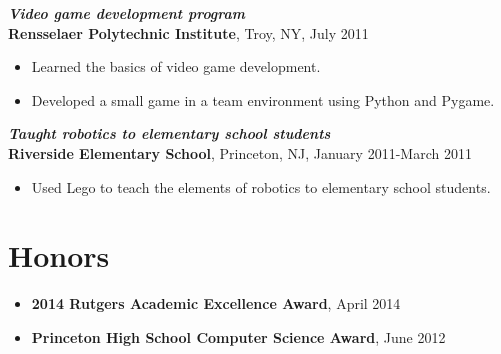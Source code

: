 \documentclass[letterpaper,12pt]{article}
\begin{document}
\textit{\textbf{Video game development program}} \\
\textbf{Rensselaer Polytechnic Institute}, Troy, NY, July 2011
\begin{itemize}
\item
Learned the basics of video game development.
\item
Developed a small game in a team environment using Python and Pygame.
\end{itemize}

\textit{\textbf{Taught robotics to elementary school students}} \\
\textbf{Riverside Elementary School}, Princeton, NJ, January 2011-March 2011
\begin{itemize}
\item
Used Lego to teach the elements of robotics to elementary school students.
\end{itemize}

\fi

\section*{Honors}
\begin{itemize}
\item
\textbf{2014 Rutgers Academic Excellence Award}, April 2014
\item
\textbf{Princeton High School Computer Science Award}, June 2012
\end{itemize}
\end{document}

